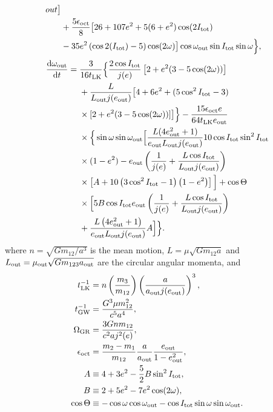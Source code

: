 \documentclass[11pt,
        usenames, %
        dvipsnames %
    ]{article}
\newcommand*{\rd}[2]{\frac{\mathrm{d}#1}{\mathrm{d}#2}}
\newcommand*{\p}[1]{\left(#1\right)}
\newcommand*{\s}[1]{\left[#1\right]}
\begin{document}
{\begin{align}
{            out}\big]\nonumber\\
        &+ \frac{5\epsilon_{\rm oct}}{8}\big[26 + 107e^2
            + 5(6 + e^2)\cos(2I_{\rm tot})\nonumber\\
        &- 35 e^2\p{\cos 2(I_{\rm tot}) - 5} \cos (2\omega)\big]
            \cos \omega_{\rm out}\sin I_{\rm tot} \sin \omega\Big\},
\end{align}
\begin{align}
    \rd{\omega_{\rm out}}{t} ={}&
        \frac{3}{16t_{\rm LK}}\Big\{\frac{2\cos I_{\rm tot}}{j(e)}
            \s{2 + e^2(3 - 5\cos(2\omega))}\nonumber\\
        &+ \frac{L}{L_{\rm out}j(e_{\rm out})}\big[4 + 6e^2
            + (5\cos^2 I_{\rm tot} - 3)\nonumber\\
        &\times [2 + e^2(3 - 5\cos(2\omega))]\big]\Big\}
            - \frac{15 \epsilon_{\rm oct}e}{64t_{\rm LK}e_{\rm out}}\nonumber\\
        &\times \Big\{ \sin \omega \sin \omega_{\rm out}\Big[
            \frac{L(4e_{\rm out}^2 + 1)}{e_{\rm out}L_{\rm out} j(e_{\rm out})}
            10 \cos I_{\rm tot}\sin^2 I_{\rm tot}\nonumber\\
        &\times(1 - e^2) - e_{\rm out}\p{\frac{1}{j(e)} +
            \frac{L \cos I_{\rm tot}}{L_{\rm out}j(e_{\rm out})}}\nonumber\\
        &\times\s{A + 10\p{3\cos^2 I_{\rm tot} - 1}\p{1 - e^2}}\Big]
            + \cos \Theta\nonumber\\
        &\times \Big[5B\cos I_{\rm tot}e_{\rm out}\p{\frac{1}{j(e)} +
            \frac{L \cos I_{\rm tot}}{L_{\rm out}j(e_{\rm out})}}\nonumber\\
        &+ \frac{L\p{4e_{\rm out}^2 + 1}}{e_{\rm out}L_{\rm out}j(e_{\rm out})}
            A\Big]\Big\}.
\end{align}
}
where $n = \sqrt{Gm_{12} / a^3}$ is the mean motion, $L = \mu \sqrt{Gm_{12}a}$
and $L_{\rm out} = \mu_{\rm out}\sqrt{Gm_{123}a_{\rm out}}$ are the circular
angular momenta, and
\begin{align}
    t_{\rm LK}^{-1} &= n\p{\frac{m_3}{m_{12}}}\p{\frac{a}{a_{\rm out}j(e_{\rm
        out})}}^3,\\
    t_{\rm GW}^{-1} &= \frac{G^3\mu m_{12}^2}{c^5a^4},\\
    \Omega_{\rm GR} &= \frac{3Gnm_{12}}{c^2aj^2(e)},\\
    \epsilon_{\rm oct} &= \frac{m_2 - m_1}{m_{12}}\frac{a}{a_{\rm out}}
        \frac{e_{\rm out}}{1 - e_{\rm out}^2},\\
    A &\equiv 4 + 3e^2 - \frac{5}{2}B\sin^2 I_{\rm tot},\\
    B &\equiv 2 + 5e^2 - 7e^2 \cos(2\omega),\\
    \cos \Theta &\equiv -\cos \omega \cos \omega_{\rm out}
        - \cos I_{\rm tot} \sin \omega \sin \omega_{\rm out}.
\end{align}
\end{document}
